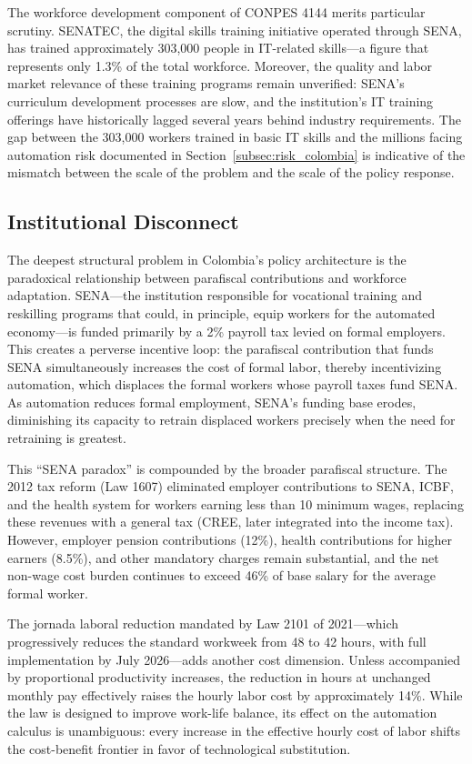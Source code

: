 \documentclass{article}
\begin{document}
The workforce development component of CONPES 4144 merits particular scrutiny. SENATEC, the digital skills training initiative operated through SENA, has trained approximately 303,000 people in IT-related skills---a figure that represents only 1.3\% of the total workforce. Moreover, the quality and labor market relevance of these training programs remain unverified: SENA's curriculum development processes are slow, and the institution's IT training offerings have historically lagged several years behind industry requirements. The gap between the 303,000 workers trained in basic IT skills and the millions facing automation risk documented in Section~\ref{subsec:risk_colombia} is indicative of the mismatch between the scale of the problem and the scale of the policy response.

\subsection{Institutional Disconnect}
\label{subsec:disconnect}

The deepest structural problem in Colombia's policy architecture is the paradoxical relationship between parafiscal contributions and workforce adaptation. SENA---the institution responsible for vocational training and reskilling programs that could, in principle, equip workers for the automated economy---is funded primarily by a 2\% payroll tax levied on formal employers. This creates a perverse incentive loop: the parafiscal contribution that funds SENA simultaneously increases the cost of formal labor, thereby incentivizing automation, which displaces the formal workers whose payroll taxes fund SENA. As automation reduces formal employment, SENA's funding base erodes, diminishing its capacity to retrain displaced workers precisely when the need for retraining is greatest.

This ``SENA paradox'' is compounded by the broader parafiscal structure. The 2012 tax reform (Law 1607) eliminated employer contributions to SENA, ICBF, and the health system for workers earning less than 10 minimum wages, replacing these revenues with a general tax (CREE, later integrated into the income tax). However, employer pension contributions (12\%), health contributions for higher earners (8.5\%), and other mandatory charges remain substantial, and the net non-wage cost burden continues to exceed 46\% of base salary for the average formal worker.

The jornada laboral reduction mandated by Law 2101 of 2021---which progressively reduces the standard workweek from 48 to 42 hours, with full implementation by July 2026---adds another cost dimension. Unless accompanied by proportional productivity increases, the reduction in hours at unchanged monthly pay effectively raises the hourly labor cost by approximately 14\%. While the law is designed to improve work-life balance, its effect on the automation calculus is unambiguous: every increase in the effective hourly cost of labor shifts the cost-benefit frontier in favor of technological substitution.
\end{document}
